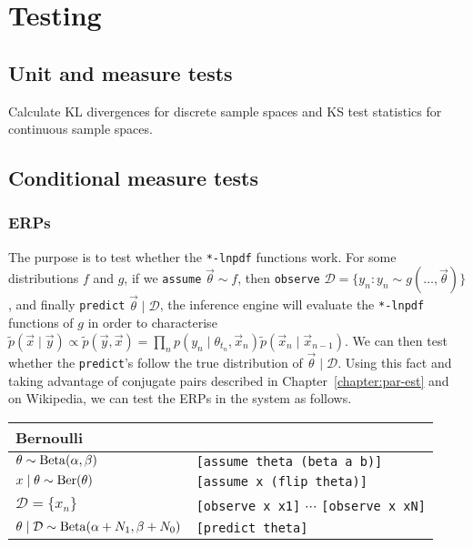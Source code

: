 \section{Testing}
\subsection{Unit and measure tests}
Calculate KL divergences for discrete sample spaces and KS test statistics for continuous sample spaces.
\subsection{Conditional measure tests}
\subsubsection{ERPs}
The purpose is to test whether the \verb!*-lnpdf! functions work. For some distributions $f$ and $g$, if we \verb!assume! $\vec\theta \sim f$, then \verb!observe! $\mathcal D = \{y_n : y_n \sim g(\dotsc, \vec \theta)\}$, and finally \verb!predict! $\vec\theta \mid \mathcal D$, the inference engine will evaluate the \verb!*-lnpdf! functions of $g$ in order to characterise $\tilde p(\vec x \mid \vec y) \propto \tilde p(\vec y, \vec x) = \prod_n p(y_n \mid \theta_{t_n}, \vec x_n) \tilde p(\vec x_n \mid \vec x_{n - 1})$. We can then test whether the \verb!predict!'s follow the true distribution of $\vec\theta \mid \mathcal D$. Using this fact and taking advantage of conjugate pairs described in Chapter~\ref{chapter:par-est} and on Wikipedia, we can test the ERPs in the system as follows.

\begin{table}[h]
\begin{tabular}{ll}
\toprule
Bernoulli & \\
\midrule
$\theta \sim \operatorname{Beta}(\alpha, \beta)$								& \texttt{[assume theta (beta a b)]} \\
$x \mid \theta \sim \operatorname{Ber}(\theta)$								& \texttt{[assume x (flip theta)]} \\
$\mathcal D = \{x_n\}$											& \texttt{[observe x x1]} $\cdots$ \texttt{[observe x xN]} \\
$\theta \mid \mathcal D \sim \operatorname{Beta}(\alpha + N_1, \beta + N_0)$	& \texttt{[predict theta]} \\
\bottomrule
\end{tabular}
\end{table}

